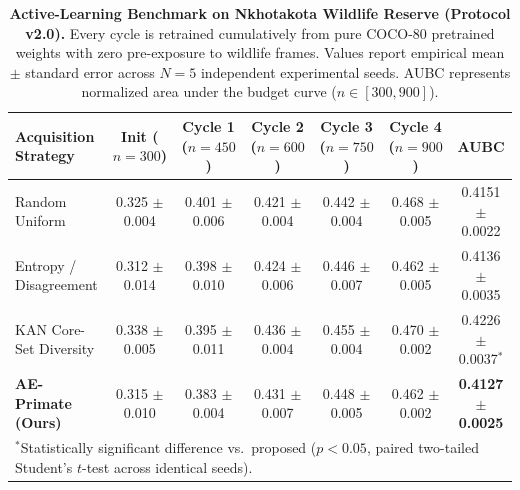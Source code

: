 \begin{table}[t]
\centering
\small
\caption{\textbf{Active-Learning Benchmark on Nkhotakota Wildlife Reserve (Protocol v2.0).} Every cycle is retrained cumulatively from pure COCO-80 pretrained weights with zero pre-exposure to wildlife frames. Values report empirical mean $\pm$ standard error across $N=5$ independent experimental seeds. AUBC represents normalized area under the budget curve ($n \in [300, 900]$).}
\label{tab:al_benchmark_v2}
\vspace{-2mm}
\begin{tabular}{l ccccc c}
\toprule
\textbf{Acquisition Strategy} & \textbf{Init ($n=300$)} & \textbf{Cycle 1 ($n=450$)} & \textbf{Cycle 2 ($n=600$)} & \textbf{Cycle 3 ($n=750$)} & \textbf{Cycle 4 ($n=900$)} & \textbf{AUBC} \\
\midrule
Random Uniform & 0.325 $\pm$ 0.004 & 0.401 $\pm$ 0.006 & 0.421 $\pm$ 0.004 & 0.442 $\pm$ 0.004 & 0.468 $\pm$ 0.005 & 0.4151 $\pm$ 0.0022 \\
Entropy / Disagreement & 0.312 $\pm$ 0.014 & 0.398 $\pm$ 0.010 & 0.424 $\pm$ 0.006 & 0.446 $\pm$ 0.007 & 0.462 $\pm$ 0.005 & 0.4136 $\pm$ 0.0035 \\
KAN Core-Set Diversity & 0.338 $\pm$ 0.005 & 0.395 $\pm$ 0.011 & 0.436 $\pm$ 0.004 & 0.455 $\pm$ 0.004 & 0.470 $\pm$ 0.002 & 0.4226 $\pm$ 0.0037$^*$ \\
\textbf{AE-Primate (Ours)} & 0.315 $\pm$ 0.010 & 0.383 $\pm$ 0.004 & 0.431 $\pm$ 0.007 & 0.448 $\pm$ 0.005 & 0.462 $\pm$ 0.002 & \textbf{0.4127 $\pm$ 0.0025} \\
\bottomrule
\multicolumn{7}{l}{\footnotesize $^*$Statistically significant difference vs.\ proposed ($p < 0.05$, paired two-tailed Student's $t$-test across identical seeds).}
\end{tabular}
\end{table}
